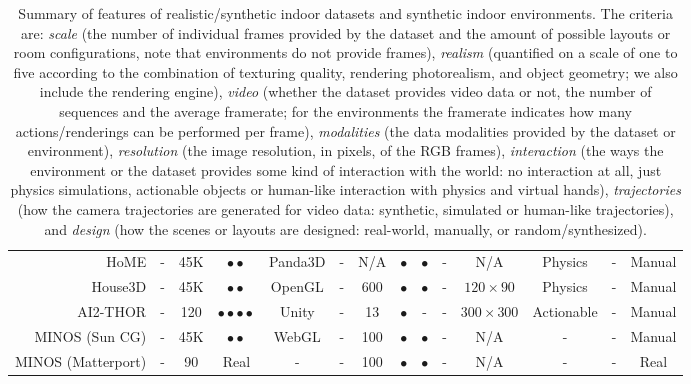 \begin{table}[!t]
{\begin{tabular}{|r|c|c|c|c|c|c|c|c|c|c|c|c|c|}
        \hline
        HoME \cite{Brodeur2017} & - & 45K & $\bullet\bullet$ & Panda3D & - & N/A & $\bullet$ & $\bullet$ & - & N/A & Physics & -  & Manual\\
        House3D \cite{Wu2018} & - & 45K & $\bullet\bullet$ & OpenGL & - & 600 & $\bullet$ & $\bullet$ & - & $120\times90$ & Physics & - & Manual\\
        AI2-THOR \cite{Kolve2017} & - & 120 & $\bullet\bullet\bullet\bullet$ & Unity & - & 13 & $\bullet$ & - & - & $300\times300$ & Actionable & - & Manual\\
        MINOS (Sun CG) \cite{Savva2017} & - & 45K & $\bullet\bullet$ & WebGL & - & 100 & $\bullet$ & $\bullet$ & - & N/A &  - & - & Manual\\
        MINOS (Matterport) \cite{Savva2017} & - & 90 & Real & - & - & 100 & $\bullet$ & $\bullet$ & - & N/A &  - & - & Real\\
      \hline
      \end{tabular}
    }
    \caption{Summary of features of realistic/synthetic indoor datasets and synthetic indoor environments. The criteria are: \emph{scale} (the number of individual frames provided by the dataset and the amount of possible layouts or room configurations, note that environments do not provide frames), \emph{realism} (quantified on a scale of one to five according to the combination of texturing quality, rendering photorealism, and object geometry; we also include the rendering engine), \emph{video} (whether the dataset provides video data or not, the number of sequences and the average framerate; for the environments the framerate indicates how many actions/renderings can be performed per frame), \emph{modalities} (the data modalities provided by the dataset or environment), \emph{resolution} (the image resolution, in pixels, of the RGB frames), \emph{interaction} (the ways the environment or the dataset provides some kind of interaction with the world: no interaction at all, just physics simulations, actionable objects or human-like interaction with physics and virtual hands), \emph{trajectories} (how the camera trajectories are generated for video data: synthetic, simulated or human-like trajectories), and \emph{design} (how the scenes or layouts are designed: real-world, manually, or random/synthesized).}
    \label{table:sim2real:dataset_features}
  \end{table}

